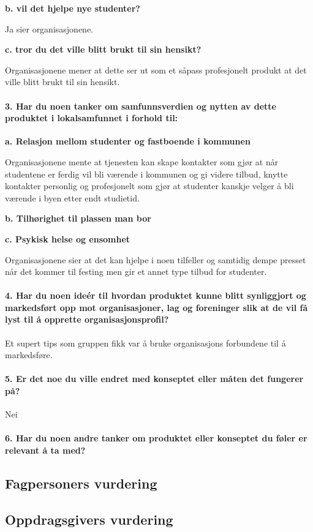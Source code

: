 {\bf b. vil det hjelpe nye studenter?}

Ja sier organisasjonene.

{\bf c. tror du det ville blitt brukt til sin hensikt?}

Organisasjonene mener at dette ser ut som et såpass profesjonelt produkt at det ville blitt brukt til sin hensikt.

\paragraph{3. Har du noen tanker om samfunnsverdien og nytten av dette produktet i lokalsamfunnet i forhold til:}

{\bf a. Relasjon mellom studenter og fastboende i kommunen}

Organisasjonene mente at tjenesten kan skape kontakter som gjør at når studentene er ferdig vil bli værende i kommunen og gi videre tilbud, knytte kontakter personlig og profesjonelt som gjør at studenter kanskje velger å bli værende i byen etter endt studietid.

{\bf b. Tilhørighet til plassen man bor}



{\bf c. Psykisk helse og ensomhet}

Organisasjonene sier at det kan hjelpe i noen tilfeller og samtidig dempe presset når det kommer til festing men gir et annet type tilbud for studenter.

\paragraph{4. Har du noen ideér til hvordan produktet kunne blitt synliggjort og markedsført opp mot organisasjoner, lag og foreninger slik at de vil få lyst til å opprette organisasjonsprofil?}

Et supert tips som gruppen fikk var å bruke organisasjons forbundene til å markedsføre.

\paragraph{5. Er det noe du ville endret med konseptet eller måten det fungerer på?}

Nei

\paragraph{6. Har du noen andre tanker om produktet eller konseptet du føler er relevant å ta med?}





\subsection{Fagpersoners vurdering}

\subsection{Oppdragsgivers vurdering}



